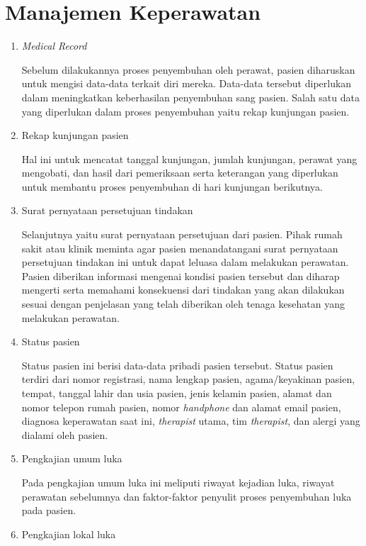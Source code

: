 \section{Manajemen Keperawatan}
\begin{enumerate}
\item \textit{Medical Record}

Sebelum dilakukannya proses penyembuhan oleh perawat, pasien diharuskan untuk mengisi data-data terkait diri mereka. Data-data tersebut diperlukan dalam meningkatkan keberhasilan penyembuhan sang pasien. Salah satu data yang diperlukan dalam proses penyembuhan yaitu rekap kunjungan pasien.

\item Rekap kunjungan pasien

Hal ini untuk mencatat tanggal kunjungan, jumlah kunjungan, perawat yang mengobati, dan hasil dari pemeriksaan serta keterangan yang diperlukan untuk membantu proses penyembuhan di hari kunjungan berikutnya.

\item Surat pernyataan persetujuan tindakan

Selanjutnya yaitu surat pernyataan persetujuan dari pasien. Pihak rumah sakit atau klinik meminta agar pasien menandatangani surat pernyataan persetujuan tindakan ini untuk dapat leluasa dalam melakukan perawatan. Pasien diberikan informasi mengenai kondisi pasien tersebut dan diharap mengerti serta memahami konsekuensi dari tindakan yang akan dilakukan sesuai dengan penjelasan yang telah diberikan oleh tenaga kesehatan yang melakukan perawatan.

\item Status pasien

Status pasien ini berisi data-data pribadi pasien tersebut. Status pasien terdiri dari nomor registrasi, nama lengkap pasien, agama/keyakinan pasien, tempat, tanggal lahir dan usia pasien, jenis kelamin pasien, alamat dan nomor telepon rumah pasien, nomor \textit{handphone} dan alamat email pasien, diagnosa keperawatan saat ini, \textit{therapist} utama, tim \textit{therapist}, dan alergi yang dialami oleh pasien.

\item Pengkajian umum luka

Pada pengkajian umum luka ini meliputi riwayat kejadian luka, riwayat perawatan sebelumnya dan faktor-faktor penyulit proses penyembuhan luka pada pasien.

\item Pengkajian lokal luka


\end{enumerate}
